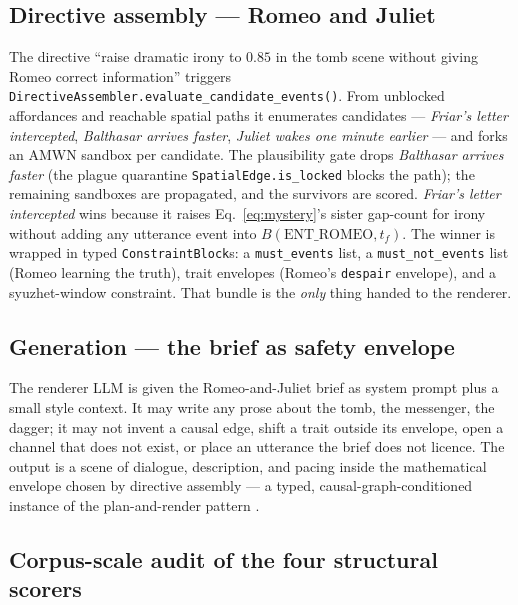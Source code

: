\documentclass[11pt]{article}
\begin{document}
\subsection{Directive assembly --- Romeo and Juliet}
\label{app:ex-directive}

The directive ``raise dramatic irony to $0.85$ in the tomb scene
without giving Romeo correct information'' triggers
\texttt{DirectiveAssembler.evaluate\_candidate\_events()}. From
unblocked affordances and reachable spatial paths it enumerates
candidates --- \emph{Friar's letter intercepted}, \emph{Balthasar
arrives faster}, \emph{Juliet wakes one minute earlier} --- and
forks an AMWN sandbox per candidate. The plausibility gate drops
\emph{Balthasar arrives faster} (the plague quarantine
\texttt{SpatialEdge.is\_locked} blocks the path); the remaining
sandboxes are propagated, and the survivors are scored. \emph{Friar's
letter intercepted} wins because it raises Eq.~\ref{eq:mystery}'s
sister gap-count for irony without adding any utterance event into
$B(\text{ENT\_ROMEO}, t_f)$. The winner is wrapped in typed
\texttt{ConstraintBlock}s: a \texttt{must\_events} list, a
\texttt{must\_not\_events} list (Romeo learning the truth), trait
envelopes (Romeo's \texttt{despair} envelope), and a syuzhet-window
constraint. That bundle is the \emph{only} thing handed to the
renderer.

\subsection{Generation --- the brief as safety envelope}
\label{app:ex-generation}

The renderer LLM is given the Romeo-and-Juliet brief as system
prompt plus a small style context. It may write any prose about
the tomb, the messenger, the dagger; it may not invent a causal
edge, shift a trait outside its envelope, open a channel that does
not exist, or place an utterance the brief does not licence. The
output is a scene of dialogue, description, and pacing inside the
mathematical envelope chosen by directive assembly --- a typed,
causal-graph-conditioned instance of the plan-and-render pattern
\citep{riedlyoung2010narrative,yao2019planwrite,
goldfarbtarrant2020aristotelian,yang2023doc}.

\subsection{Corpus-scale audit of the four structural scorers}
\label{app:scorer-audit}
\end{document}
